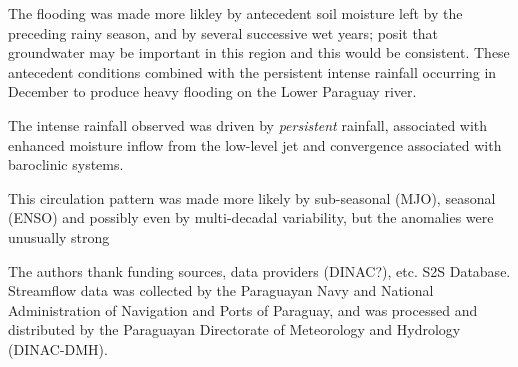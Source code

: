 \documentclass{ametsoc}
\begin{document}
The flooding was made more likley by antecedent soil moisture left by the preceding rainy season, and by several successive wet years; \citet{Santos:2016td} posit that groundwater may be important in this region and this would be consistent. These antecedent conditions combined with the persistent intense rainfall occurring in December to produce heavy flooding on the Lower Paraguay river.

The intense rainfall observed was driven by \emph{persistent} rainfall, associated with enhanced moisture inflow from the low-level jet and convergence associated with baroclinic systems.

This circulation pattern was made more likely by sub-seasonal (MJO), seasonal (ENSO) and possibly even by multi-decadal variability, but the anomalies were unusually strong



\acknowledgments
The authors thank funding sources, data providers (DINAC?), etc. S2S Database.
Streamflow data was collected by the Paraguayan Navy and National Administration of Navigation and Ports of Paraguay, and was processed and distributed by the Paraguayan Directorate of Meteorology and Hydrology (DINAC-DMH).




\end{document}
